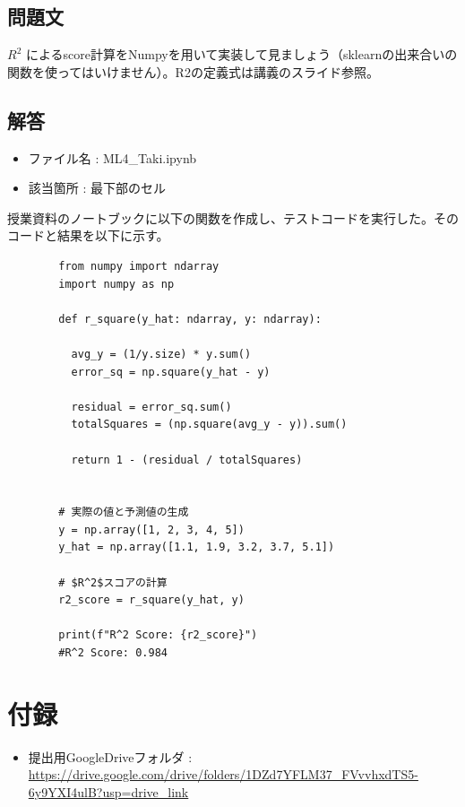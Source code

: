 \documentclass{article}[jsarticle]
\begin{document}
    \subsection{問題文}
    $R^2$ によるscore計算をNumpyを用いて実装して見ましょう（sklearnの出来合いの関数を使ってはいけません）。R2の定義式は講義のスライド参照。

    \subsection{解答}
    \begin{itemize}
        \item ファイル名 : ML4\_Taki.ipynb
        \item 該当箇所 : 最下部のセル
    \end{itemize}
    授業資料のノートブックに以下の関数を作成し、テストコードを実行した。そのコードと結果を以下に示す。
    \begin{lstlisting}
        from numpy import ndarray
        import numpy as np
        
        def r_square(y_hat: ndarray, y: ndarray):
        
          avg_y = (1/y.size) * y.sum()
          error_sq = np.square(y_hat - y)
          
          residual = error_sq.sum()
          totalSquares = (np.square(avg_y - y)).sum()
        
          return 1 - (residual / totalSquares)
        
        
        # 実際の値と予測値の生成
        y = np.array([1, 2, 3, 4, 5])
        y_hat = np.array([1.1, 1.9, 3.2, 3.7, 5.1])
        
        # $R^2$スコアの計算
        r2_score = r_square(y_hat, y)
        
        print(f"R^2 Score: {r2_score}")
        #R^2 Score: 0.984
    \end{lstlisting}
        
        

\section{付録}
\begin{itemize}
    \item 提出用GoogleDriveフォルダ : \url{https://drive.google.com/drive/folders/1DZd7YFLM37_FVvvhxdTS5-6y9YXI4ulB?usp=drive_link}
\end{itemize}
\end{document}
